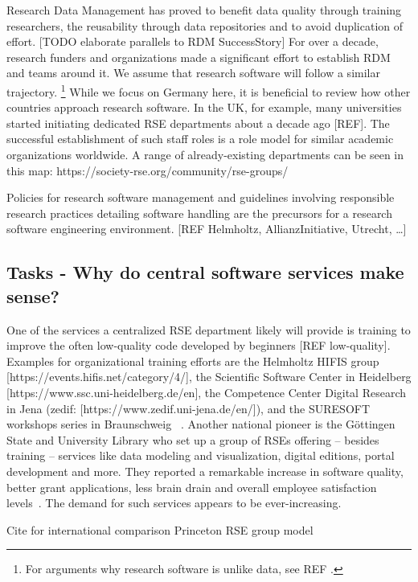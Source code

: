 \documentclass{article}
\begin{document}
Research Data Management has proved to benefit data quality through training researchers, the reusability through data repositories and to avoid duplication of effort.
[TODO elaborate parallels to RDM SuccessStory] For over a decade, research funders and organizations made a significant effort to establish RDM and teams around it.
We assume that research software will follow a similar trajectory.
\footnote{For arguments why research software is unlike data, see REF .}
While we focus on Germany here, it is beneficial to review how other countries approach research software.
In the UK, for example, many universities started initiating dedicated RSE departments about a decade ago [REF].
The successful establishment of such staff roles is a role model for similar academic organizations worldwide.
A range of already-existing departments can be seen in this map: https://society-rse.org/community/rse-groups/ 

Policies for research software management and guidelines involving responsible research practices detailing software handling are the precursors for a research software engineering environment. [REF Helmholtz, AllianzInitiative, Utrecht, …]

\subsection{Tasks - Why do central software services make sense?}

One of the services a centralized RSE department likely will provide is training to improve the often low-quality code developed by beginners [REF low-quality].
Examples for organizational training efforts are the Helmholtz HIFIS group [https://events.hifis.net/category/4/], the Scientific Software Center in Heidelberg [https://www.ssc.uni-heidelberg.de/en], the Competence Center Digital Research in Jena (zedif: [https://www.zedif.uni-jena.de/en/]), and the SURESOFT workshops series in Braunschweig ~\autocite{SURESOFTLink}.
Another national pioneer is the Göttingen State and University Library who set up a group of RSEs offering – besides training – services like data modeling and visualization, digital editions, portal development and more. They reported a remarkable increase in software quality, better grant applications, less brain drain and overall employee satisfaction levels~\autocite{schimavoigt2023}.
The demand for such services appears to be ever-increasing.

Cite for international comparison \autocite{Cosden2022} Princeton RSE group model
\end{document}

